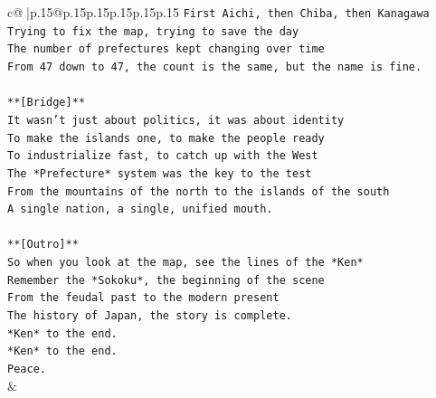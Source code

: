 \documentclass{article}
\begin{document}
{\begin{supertabular}{c@{$\;$}|p{.15\linewidth}@{}p{.15\linewidth}p{.15\linewidth}p{.15\linewidth}p{.15\linewidth}p{.15\linewidth}}
{{{\texttt{First Aichi, then Chiba, then Kanagawa} \\
\texttt{Trying to fix the map, trying to save the day} \\
\texttt{The number of prefectures kept changing over time} \\
\texttt{From 47 down to 47, the count is the same, but the name is fine.} \\
\\ 
\texttt{**{[}Bridge{]}**} \\
\texttt{It wasn't just about politics, it was about identity} \\
\texttt{To make the islands one, to make the people ready} \\
\texttt{To industrialize fast, to catch up with the West} \\
\texttt{The *Prefecture* system was the key to the test} \\
\texttt{From the mountains of the north to the islands of the south} \\
\texttt{A single nation, a single, unified mouth.} \\
\\ 
\texttt{**{[}Outro{]}**} \\
\texttt{So when you look at the map, see the lines of the *Ken*} \\
\texttt{Remember the *Sokoku*, the beginning of the scene} \\
\texttt{From the feudal past to the modern present} \\
\texttt{The history of Japan, the story is complete.} \\
\texttt{*Ken* to the end.} \\
\texttt{*Ken* to the end.} \\
\texttt{Peace.} \\
            }
        }
    }
    & \\ \\


\end{supertabular}}
\end{document}
